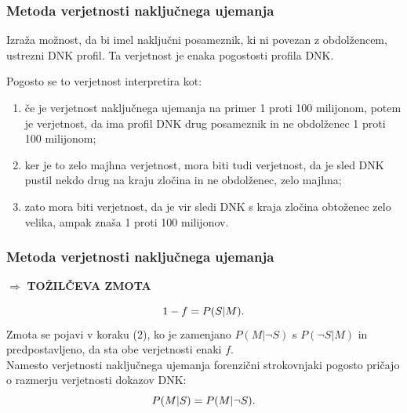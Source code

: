 \documentclass{beamer}
\begin{document}
\begin{frame}
    \frametitle{Metoda verjetnosti naključnega ujemanja}
    \begin{block}{}
        Izraža možnost, da bi imel naključni posameznik, ki ni povezan z obdolžencem, ustrezni DNK profil. Ta verjetnost je enaka pogostosti profila DNK. 
    \end{block}\vspace{2mm}
    Pogosto se to verjetnost interpretira kot:
    \begin{enumerate}
        \item če je verjetnost naključnega ujemanja na primer 1 proti 100 milijonom, potem je verjetnost, da ima profil DNK drug posameznik in ne
        obdolženec 1 proti 100 milijonom;
        \item ker je to zelo majhna verjetnost, mora biti tudi verjetnost, da je sled DNK pustil nekdo drug na kraju zločina in ne obdolženec, zelo majhna;
        \item zato mora biti verjetnost, da je vir sledi DNK s kraja zločina obtoženec zelo velika, ampak znaša 1 proti 100 milijonov.
    \end{enumerate}
\end{frame}

\begin{frame}
    \frametitle{Metoda verjetnosti naključnega ujemanja}
    \begin{block}{}
        \centering
        $\Rightarrow$ \textbf{TOŽILČEVA ZMOTA}
    \end{block} \vspace{2mm}
    \[
        1 - f = P(S \lvert M). \vspace{2mm}
    \]
     Zmota se pojavi v koraku (2), ko je zamenjano $P(M \lvert \neg S)$ s $P(\neg S \lvert M)$ in predpostavljeno, da sta obe verjetnosti enaki $f$. \\\vspace{2mm}
     Namesto verjetnosti naključnega ujemanja forenzični strokovnjaki pogosto pričajo o razmerju verjetnosti dokazov DNK:
     \[
        P(M \lvert S) = P(M \lvert \neg S). \vspace{2mm}
     \] 
\end{frame}

\end{document}
